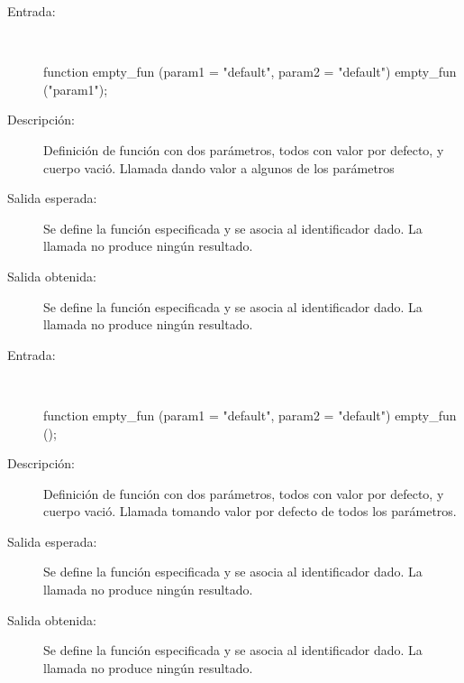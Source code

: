 	\begin{description}
		\item [Entrada:] \hfill \\
\begin{myverbatim}
   function empty_fun (param1 = "default", param2 = "default") { } 
   empty_fun ("param1");
\end{myverbatim}
		\item [Descripción:] Definición de función con dos parámetros, todos con valor por defecto, y cuerpo vació. Llamada dando valor a algunos de los parámetros
		\item [Salida esperada:] Se define la función especificada y se asocia al identificador dado. La llamada no produce ningún resultado.
		\item [Salida obtenida:] Se define la función especificada y se asocia al identificador dado. La llamada no produce ningún resultado.
	\end{description}

	\begin{description}
		\item [Entrada:] \hfill \\
\begin{myverbatim}
   function empty_fun (param1 = "default", param2 = "default") { } 
   empty_fun ();
\end{myverbatim}
		\item [Descripción:] Definición de función con dos parámetros, todos con valor por defecto, y cuerpo vació. Llamada tomando valor por defecto de todos los parámetros.
		\item [Salida esperada:] Se define la función especificada y se asocia al identificador dado. La llamada no produce ningún resultado. 
		\item [Salida obtenida:] Se define la función especificada y se asocia al identificador dado. La llamada no produce ningún resultado.
	\end{description}

